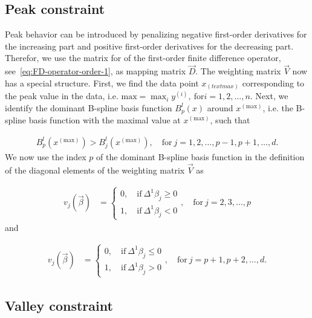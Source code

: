 \documentclass[10pt,a4paper]{report}
\begin{document}
\subsection{Peak constraint} \label{subsec:PeakC}

Peak behavior can be introduced by penalizing negative first-order derivatives for the increasing part and positive first-order derivatives for the decreasing part. Therefor, we use the matrix for of the first-order finite difference operator, see~\ref{eq:FD-operator-order-1}, as mapping matrix $\vec{D}$. The weighting matrix $\vec{V}$ now has a special structure. First, we find the data point $x_{(text{max})}$ corresponding to the peak value in the data, i.e. $\text{max} = \max_i y^{(i)}, \ \text{for} i=1,2,\dots, n$. Next, we identify the dominant B-spline basis function $B_p^l(x)$ around $x^{(\text{max})}$, i.e. the B-spline basis function with the maximal value at $x^{(\text{max})}$, such that

\begin{align}
	B_p^l(x^{(\text{max})}) > B_j^l(x^{(\text{max})}), \quad \text{for} \ j=1,2,\dots,p-1,p+1,\dots,d.
\end{align} 
%
We now use the index $p$ of the dominant B-spline basis function in the definition of the diagonal elements of the weighting matrix $\vec{V}$ as 

\begin{align}\label{eq:v_peak_1}
	v_j(\vec{\beta}) &= \begin{cases} 
		0, \quad \text{if} \ \Delta^1\beta_j \ge 0 \\ 
		1, \quad \text{if} \ \Delta^1\beta_j  < 0
	\end{cases}, \quad \text{for} \ j=2,3,\dots,p
\end{align}
%
and 

\begin{align}\label{eq:v_peak_2}
	v_j(\vec{\beta}) &= \begin{cases} 
		0, \quad \text{if} \ \Delta^1\beta_j \le 0 \\ 
		1, \quad \text{if} \ \Delta^1\beta_j > 0
	\end{cases}, \quad \text{for} \ j=p+1,p+2,\dots,d.
\end{align}
%
\subsection{Valley constraint} \label{subsec:ValleyC}
\end{document}
